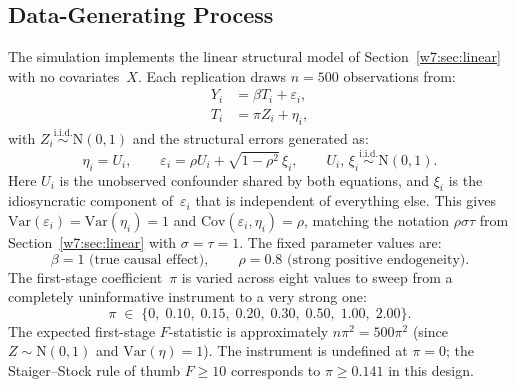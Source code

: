 \documentclass[master.tex]{subfiles}
\begin{document}
\subsection*{Data-Generating Process}

\begin{tcolorbox}[defstyle, title={DGP for Lab~7}]
\label{w7:lab:dgp}
The simulation implements the linear structural model of
Section~\ref{w7:sec:linear} with no covariates~$X$.  Each
replication draws $n = 500$ observations from:
\begin{align}
  Y_i &= \beta T_i + \varepsilon_i, \label{w7:lab:outcome} \\
  T_i &= \pi Z_i + \eta_i,          \label{w7:lab:fs}
\end{align}
with $Z_i \overset{\mathrm{i.i.d.}}{\sim} \mathrm{N}(0,1)$ and
the structural errors generated as:
\[
  \eta_i = U_i, \qquad
  \varepsilon_i = \rho U_i + \sqrt{1 - \rho^2}\,\xi_i,
  \qquad U_i,\, \xi_i \overset{\mathrm{i.i.d.}}{\sim} \mathrm{N}(0,1).
\]
Here $U_i$ is the unobserved confounder shared by both equations,
and $\xi_i$ is the idiosyncratic component of~$\varepsilon_i$
that is independent of everything else.
This gives $\mathrm{Var}(\varepsilon_i) = \mathrm{Var}(\eta_i) = 1$
and $\mathrm{Cov}(\varepsilon_i, \eta_i) = \rho$, matching
the notation $\rho\sigma\tau$ from Section~\ref{w7:sec:linear}
with $\sigma = \tau = 1$.  The fixed parameter values are:
\[
  \beta = 1 \text{ (true causal effect)},
  \qquad
  \rho = 0.8 \text{ (strong positive endogeneity)}.
\]
The first-stage coefficient~$\pi$ is varied across eight
values to sweep from a completely uninformative instrument
to a very strong one:
\[
  \pi \;\in\; \{0,\; 0.10,\; 0.15,\; 0.20,\; 0.30,\; 0.50,\; 1.00,\; 2.00\}.
\]
The expected first-stage $F$-statistic is approximately
$n\pi^2 = 500\pi^2$ (since $Z \sim \mathrm{N}(0,1)$ and
$\mathrm{Var}(\eta) = 1$).  The instrument is undefined at
$\pi = 0$; the Staiger--Stock rule of thumb $F \geq 10$
corresponds to $\pi \geq 0.141$ in this design.
\end{tcolorbox}
\end{document}

